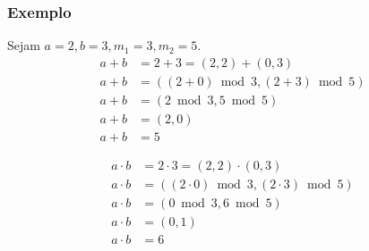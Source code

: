\subsubsection*{Exemplo}
Sejam $a = 2, b = 3, m_1 = 3, m_2 = 5$.
\begin{align*}
    a + b & = 2 + 3 = (2,2) + (0,3)              \\
    a + b & = ((2 + 0) \bmod 3, (2 + 3) \bmod 5) \\
    a + b & = (2 \bmod 3, 5 \bmod 5)             \\
    a + b & = (2, 0)                             \\
    a + b & = 5
\end{align*}

\begin{align*}
    a \cdot b & = 2 \cdot 3 = (2,2) \cdot (0,3)              \\
    a \cdot b & = ((2 \cdot 0) \bmod 3, (2 \cdot 3) \bmod 5) \\
    a \cdot b & = (0 \bmod 3, 6 \bmod 5)                     \\
    a \cdot b & = (0, 1)                                     \\
    a \cdot b & = 6
\end{align*}